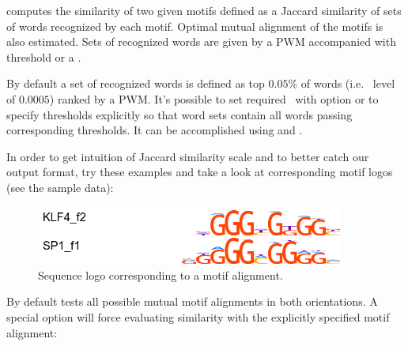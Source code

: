  computes the similarity of two given motifs defined as a Jaccard similarity of sets of words recognized by each motif.
Optimal mutual alignment of the motifs is also estimated. Sets of recognized words are given by a PWM accompanied with threshold or a \pvalue. 

By default a set of recognized words is defined as top $0.05\%$ of words (i.e. \pvalue\ level of $0.0005$) ranked by a PWM.
It's possible to set required \pvalue\ with  option or to specify thresholds explicitly so that word sets contain all words passing corresponding thresholds. It can be accomplished using  and .

In order to get intuition of Jaccard similarity scale and to better catch our output format, try these examples and take a look at corresponding motif logos (see the sample data):



\begin{figure}[h]
\centering
\includegraphics[width=0.9\textwidth]{./images/alignment_KLF4_SP1.png}
\caption{Sequence logo corresponding to a motif alignment.}\label{motif-alignment-figure}
\end{figure}




By default  tests all possible mutual motif alignments in both orientations. 
A special option  will force evaluating similarity with the explicitly specified motif alignment:

